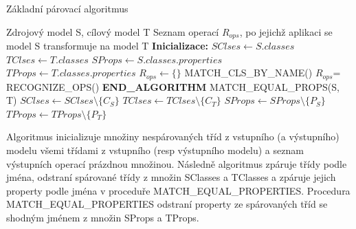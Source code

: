 \documentclass[11pt,twoside,a4paper]{book}
\begin{document}
 \begin{algorithm}
 \caption{Základní párovací algoritmus}\label{algo:matching}

\begin{algorithmic}[1]
   \Require Zdrojový model S, cílový model T
   \Ensure Seznam operací $R_{ops}$, po jejichž aplikaci se model S transformuje
       na model T
   \Statex
   \State \textbf{Inicializace:}
   \State $SClses \gets S.classes$  
   \State $TClses \gets T.classes$ 
   \State $SProps \gets S.classes.properties$ 
   \State $TProps \gets T.classes.properties$ 
   \State $R_{ops} \gets \{\}$
   \Statex	   
   \State MATCH\_CLS\_BY\_NAME()
   \State $R_{ops}$= RECOGNIZE\_OPS()
   \State \textbf{END\_ALGORITHM}
   \Statex
    \label{algo:matching:forEqualCls}
   	        \State MATCH\_EQUAL\_PROPS(S, T) 
   	        \State $SClses \gets SClses \setminus \{ C_S\}$
   	        \State $TClses \gets TClses \setminus \{ C_T\}$   	        
   	     \EndIf
      \EndFor
   \EndFor
  \EndProcedure	      
   \Statex	
   	           \State $SProps \gets SProps \setminus \{ P_S\}$
   	           \State $TProps \gets TProps \setminus \{ P_T\}$
   	        \EndIf
   	      \EndFor
   	   \EndFor
   \EndProcedure  
\end{algorithmic}
\end{algorithm}
\FloatBarrier

Algoritmus inicializuje množiny nespárovaných tříd z vstupního (a výstupního)
modelu všemi třídami z vstupního (resp výstupního modelu) a seznam výstupních
operací prázdnou množinou. Následně algoritmus zpáruje třídy podle jména,
odstraní spárované třídy z množin SClasses a TClasses a zpáruje jejich property
podle jména v proceduře MATCH\_EQUAL\_PROPERTIES. Procedura
MATCH\_EQUAL\_PROPERTIES odstraní property ze spárovaných tříd se shodným jménem
z množin SProps a TProps.
\end{document}
